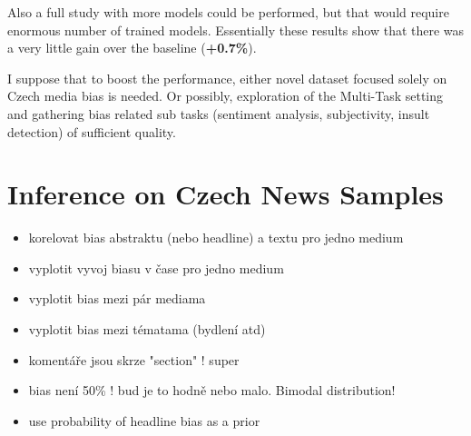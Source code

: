 Also a full study with more models could be performed, but that would require enormous number of trained models. Essentially these results show that there was a very little gain over the baseline (\textbf{+0.7\%}).

I suppose that to boost the performance, either novel dataset focused solely on Czech media bias is needed. Or possibly, exploration of the Multi-Task setting and gathering bias related sub tasks (sentiment analysis, subjectivity, insult detection) of sufficient quality.


  

\section{Inference on Czech News Samples}

\begin{itemize}
    \item korelovat bias abstraktu (nebo headline) a textu pro jedno medium
    \item vyplotit vyvoj biasu v čase pro jedno medium
    \item vyplotit bias mezi pár mediama
    \item vyplotit bias mezi tématama (bydlení atd)
    \item komentáře jsou skrze "section" ! super
    \item bias není 50\% ! bud je to hodně nebo malo. Bimodal distribution!
    \item use probability of headline bias as a prior
\end{itemize}
